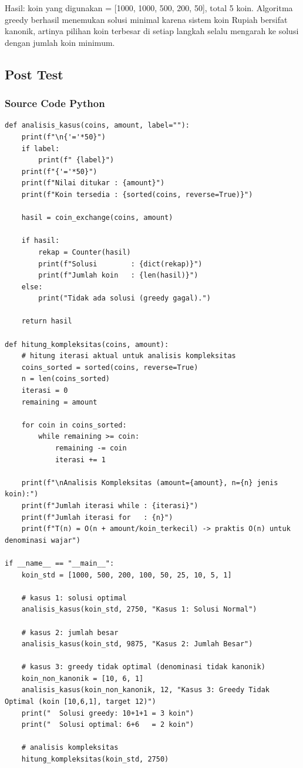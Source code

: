 Hasil: koin yang digunakan = [1000, 1000, 500, 200, 50], total 5 koin. Algoritma greedy berhasil menemukan solusi minimal karena sistem koin Rupiah bersifat kanonik, artinya pilihan koin terbesar di setiap langkah selalu mengarah ke solusi dengan jumlah koin minimum.

\subsection{Post Test}

\subsubsection*{Source Code Python}
\begin{lstlisting}[basicstyle=\ttfamily\scriptsize, frame=single, backgroundcolor=\color{white}, numbers=none, keywordstyle=\color{black}, commentstyle=\color{black}, stringstyle=\color{black}, breaklines=true]
def analisis_kasus(coins, amount, label=""):
    print(f"\n{'='*50}")
    if label:
        print(f" {label}")
    print(f"{'='*50}")
    print(f"Nilai ditukar : {amount}")
    print(f"Koin tersedia : {sorted(coins, reverse=True)}")

    hasil = coin_exchange(coins, amount)

    if hasil:
        rekap = Counter(hasil)
        print(f"Solusi        : {dict(rekap)}")
        print(f"Jumlah koin   : {len(hasil)}")
    else:
        print("Tidak ada solusi (greedy gagal).")

    return hasil

def hitung_kompleksitas(coins, amount):
    # hitung iterasi aktual untuk analisis kompleksitas
    coins_sorted = sorted(coins, reverse=True)
    n = len(coins_sorted)
    iterasi = 0
    remaining = amount

    for coin in coins_sorted:
        while remaining >= coin:
            remaining -= coin
            iterasi += 1

    print(f"\nAnalisis Kompleksitas (amount={amount}, n={n} jenis koin):")
    print(f"Jumlah iterasi while : {iterasi}")
    print(f"Jumlah iterasi for   : {n}")
    print(f"T(n) = O(n + amount/koin_terkecil) -> praktis O(n) untuk denominasi wajar")

if __name__ == "__main__":
    koin_std = [1000, 500, 200, 100, 50, 25, 10, 5, 1]

    # kasus 1: solusi optimal
    analisis_kasus(koin_std, 2750, "Kasus 1: Solusi Normal")

    # kasus 2: jumlah besar
    analisis_kasus(koin_std, 9875, "Kasus 2: Jumlah Besar")

    # kasus 3: greedy tidak optimal (denominasi tidak kanonik)
    koin_non_kanonik = [10, 6, 1]
    analisis_kasus(koin_non_kanonik, 12, "Kasus 3: Greedy Tidak Optimal (koin [10,6,1], target 12)")
    print("  Solusi greedy: 10+1+1 = 3 koin")
    print("  Solusi optimal: 6+6   = 2 koin")

    # analisis kompleksitas
    hitung_kompleksitas(koin_std, 2750)
\end{lstlisting}

